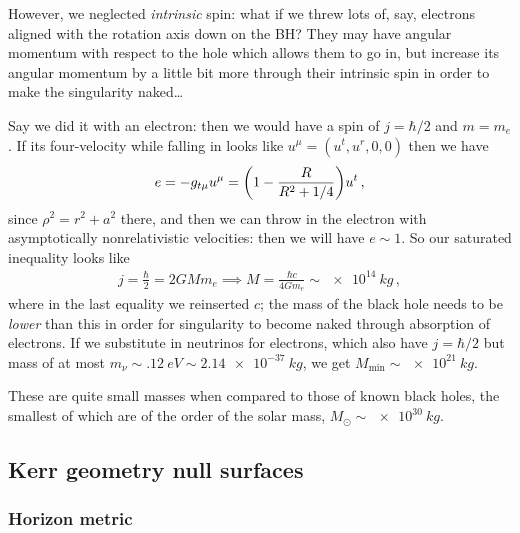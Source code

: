 \documentclass[main.tex]{subfiles}
\begin{document}
However, we neglected \emph{intrinsic} spin: what if we threw lots of, say, electrons aligned with the rotation axis down on the BH? 
They may have angular momentum with respect to the hole which allows them to go in, but increase its angular momentum by a little bit more through their intrinsic spin in order to make the singularity naked\dots

Say we did it with an electron: then we would have a spin of \(j= \hbar /2\) and \(m = m_e\). If its four-velocity while falling in looks like \(u^{\mu } = (u^{t}, u^{r}, 0,0)\) then we have 
%
\begin{align}
  e =- g_{t \mu } u^{\mu } = 
  \qty(1 - \frac{R}{R^2 + 1/4}) u^{t}
\,,
\end{align}
%
since \(\rho^2 = r^2 + a^2 \) there, and then we can throw in the electron with asymptotically nonrelativistic velocities: then we will have \(e \sim 1\). So our saturated inequality looks like 
%
\begin{align}
  j = \frac{\hbar}{2}= 2GM m_e  \implies M = \frac{\hbar c}{4Gm_e} \sim \SI{e14}{kg}
\,,
\end{align}
%
where in the last equality we reinserted \(c\);
the mass of the black hole needs to be \emph{lower} than this in order for singularity to become naked through absorption of electrons. If we substitute in neutrinos for electrons, which also have \(j = \hbar/2\) but mass of at most \(m_\nu \sim \SI{.12}{eV} \sim \SI{2.14e-37}{kg}\), we get \(M _{\text{min}} \sim \SI{e21}{kg}\). 

These are quite small masses when compared to those of known black holes, the smallest of which are of the order of the solar mass, \(M_{\odot} \sim \SI{e30}{kg}\).

\subsection{Kerr geometry null surfaces}

\subsubsection{Horizon metric}
\end{document}
